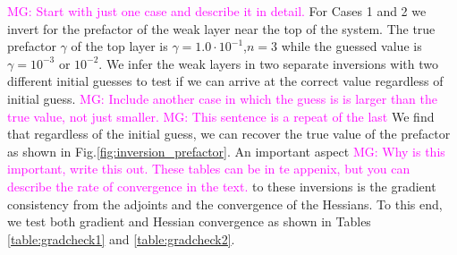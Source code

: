 \documentclass[12pt]{article}
\newcommand{\mgnote}[1]{\textcolor{magenta}{MG: #1}}
\begin{document}
\mgnote{Start with just one case and describe it in detail.}
For Cases 1 and 2 we invert for the prefactor of the weak layer near the top of the system. The true prefactor $\gamma$ of the top layer is  $\gamma=1.0\cdot 10^{-1}$,$n=3$ while the guessed value is $\gamma=10^{-3}$ or $10^{-2}$. We infer the weak layers in two separate inversions with two different initial guesses to test if we can arrive at the correct value regardless of initial guess. \mgnote{Include another case in which the guess is is larger than the true value, not just smaller.}
\mgnote{This sentence is a repeat of the last}
We find that regardless of the initial guess, we can recover the true value of the prefactor as shown in Fig.\ref{fig:inversion_prefactor}. An important aspect \mgnote{Why is this important, write this out. These tables can be in te appenix, but you can describe the rate of convergence in the text.} to these inversions is the gradient consistency from the adjoints and the convergence of the Hessians. To this end, we test both gradient and Hessian convergence as shown in Tables \ref{table:gradcheck1} and \ref{table:gradcheck2}.
\end{document}
